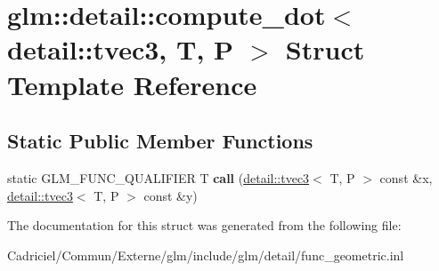 \hypertarget{structglm_1_1detail_1_1compute__dot_3_01detail_1_1tvec3_00_01_t_00_01_p_01_4}{}\section{glm\+:\+:detail\+:\+:compute\+\_\+dot$<$ detail\+:\+:tvec3, T, P $>$ Struct Template Reference}
\label{structglm_1_1detail_1_1compute__dot_3_01detail_1_1tvec3_00_01_t_00_01_p_01_4}
\subsection*{Static Public Member Functions}
\begin{DoxyCompactItemize}
\item 
static G\+L\+M\+\_\+\+F\+U\+N\+C\+\_\+\+Q\+U\+A\+L\+I\+F\+I\+ER T {\bfseries call} (\hyperlink{structglm_1_1detail_1_1tvec3}{detail\+::tvec3}$<$ T, P $>$ const \&x, \hyperlink{structglm_1_1detail_1_1tvec3}{detail\+::tvec3}$<$ T, P $>$ const \&y)\hypertarget{structglm_1_1detail_1_1compute__dot_3_01detail_1_1tvec3_00_01_t_00_01_p_01_4_a2320996e972e6955b19c23ab96c77626}{}\label{structglm_1_1detail_1_1compute__dot_3_01detail_1_1tvec3_00_01_t_00_01_p_01_4_a2320996e972e6955b19c23ab96c77626}

\end{DoxyCompactItemize}


The documentation for this struct was generated from the following file\+:\begin{DoxyCompactItemize}
\item 
Cadriciel/\+Commun/\+Externe/glm/include/glm/detail/func\+\_\+geometric.\+inl\end{DoxyCompactItemize}
